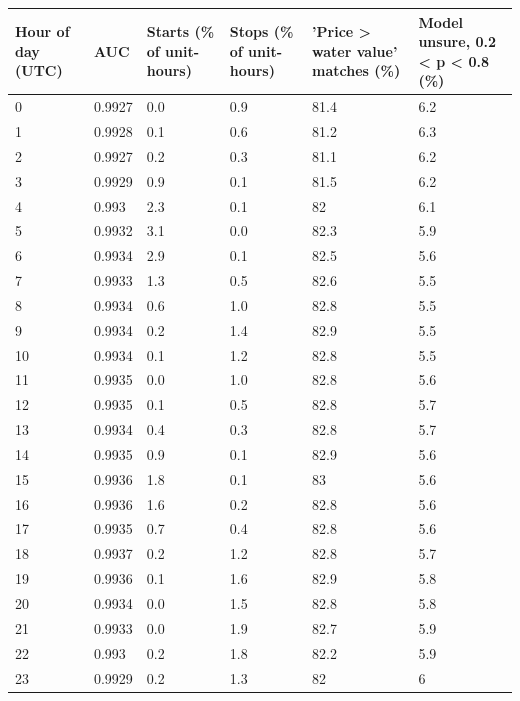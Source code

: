 \begin{tabular}{p{1.8cm}p{1.2cm}p{1.9cm}p{1.9cm}p{2.6cm}p{2.6cm}}
\toprule
\textbf{Hour of day (UTC)} & \textbf{AUC} & \textbf{Starts (\% of unit-hours)} & \textbf{Stops (\% of unit-hours)} & \textbf{'Price > water value' matches (\%)} & \textbf{Model unsure, 0.2 < p < 0.8 (\%)} \\
\midrule
0 & 0.9927 & 0.0 & 0.9 & 81.4 & 6.2 \\
1 & 0.9928 & 0.1 & 0.6 & 81.2 & 6.3 \\
2 & 0.9927 & 0.2 & 0.3 & 81.1 & 6.2 \\
3 & 0.9929 & 0.9 & 0.1 & 81.5 & 6.2 \\
4 & 0.993 & 2.3 & 0.1 & 82 & 6.1 \\
5 & 0.9932 & 3.1 & 0.0 & 82.3 & 5.9 \\
6 & 0.9934 & 2.9 & 0.1 & 82.5 & 5.6 \\
7 & 0.9933 & 1.3 & 0.5 & 82.6 & 5.5 \\
8 & 0.9934 & 0.6 & 1.0 & 82.8 & 5.5 \\
9 & 0.9934 & 0.2 & 1.4 & 82.9 & 5.5 \\
10 & 0.9934 & 0.1 & 1.2 & 82.8 & 5.5 \\
11 & 0.9935 & 0.0 & 1.0 & 82.8 & 5.6 \\
12 & 0.9935 & 0.1 & 0.5 & 82.8 & 5.7 \\
13 & 0.9934 & 0.4 & 0.3 & 82.8 & 5.7 \\
14 & 0.9935 & 0.9 & 0.1 & 82.9 & 5.6 \\
15 & 0.9936 & 1.8 & 0.1 & 83 & 5.6 \\
16 & 0.9936 & 1.6 & 0.2 & 82.8 & 5.6 \\
17 & 0.9935 & 0.7 & 0.4 & 82.8 & 5.6 \\
18 & 0.9937 & 0.2 & 1.2 & 82.8 & 5.7 \\
19 & 0.9936 & 0.1 & 1.6 & 82.9 & 5.8 \\
20 & 0.9934 & 0.0 & 1.5 & 82.8 & 5.8 \\
21 & 0.9933 & 0.0 & 1.9 & 82.7 & 5.9 \\
22 & 0.993 & 0.2 & 1.8 & 82.2 & 5.9 \\
23 & 0.9929 & 0.2 & 1.3 & 82 & 6 \\
\bottomrule
\end{tabular}
